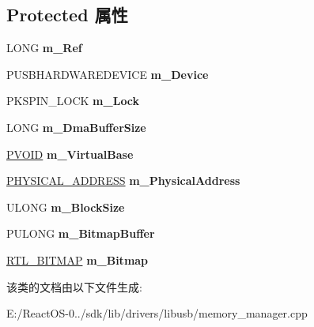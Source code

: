 \subsection*{Protected 属性}
\begin{DoxyCompactItemize}
\item 
\mbox{\label{class_c_d_m_a_memory_manager_a1c101dcc4b2e553eb495578d5b53f967}} 
L\+O\+NG {\bfseries m\+\_\+\+Ref}
\item 
\mbox{\label{class_c_d_m_a_memory_manager_abf989b40950d7e32b49cbe8edf371677}} 
P\+U\+S\+B\+H\+A\+R\+D\+W\+A\+R\+E\+D\+E\+V\+I\+CE {\bfseries m\+\_\+\+Device}
\item 
\mbox{\label{class_c_d_m_a_memory_manager_a4f8f6e2d51571c87c634f8ef1164fc14}} 
P\+K\+S\+P\+I\+N\+\_\+\+L\+O\+CK {\bfseries m\+\_\+\+Lock}
\item 
\mbox{\label{class_c_d_m_a_memory_manager_a24c18c62d87c38ee3c9af5fd8039f5b6}} 
L\+O\+NG {\bfseries m\+\_\+\+Dma\+Buffer\+Size}
\item 
\mbox{\label{class_c_d_m_a_memory_manager_a46b62060210cec4595b4605ae2ba69f4}} 
\hyperlink{interfacevoid}{P\+V\+O\+ID} {\bfseries m\+\_\+\+Virtual\+Base}
\item 
\mbox{\label{class_c_d_m_a_memory_manager_a2ad8e93d116a6b66fccff76cdbb87e16}} 
\hyperlink{union___l_a_r_g_e___i_n_t_e_g_e_r}{P\+H\+Y\+S\+I\+C\+A\+L\+\_\+\+A\+D\+D\+R\+E\+SS} {\bfseries m\+\_\+\+Physical\+Address}
\item 
\mbox{\label{class_c_d_m_a_memory_manager_a8aa22dcb26c4c6233770a96b0c07cdfb}} 
U\+L\+O\+NG {\bfseries m\+\_\+\+Block\+Size}
\item 
\mbox{\label{class_c_d_m_a_memory_manager_abdd9037e1baada7723832d0925cd05d7}} 
P\+U\+L\+O\+NG {\bfseries m\+\_\+\+Bitmap\+Buffer}
\item 
\mbox{\label{class_c_d_m_a_memory_manager_ac42d005c7c8b3e0a938a3028b262a0f9}} 
\hyperlink{struct___r_t_l___b_i_t_m_a_p}{R\+T\+L\+\_\+\+B\+I\+T\+M\+AP} {\bfseries m\+\_\+\+Bitmap}
\end{DoxyCompactItemize}


该类的文档由以下文件生成\+:\begin{DoxyCompactItemize}
\item 
E\+:/\+React\+O\+S-\/0../sdk/lib/drivers/libusb/memory\+\_\+manager.\+cpp\end{DoxyCompactItemize}
